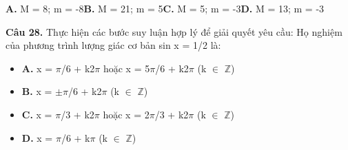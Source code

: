\documentclass[11pt,a4paper]{article}
\begin{document}
\hspace*{1.5em}\textbf{A.} M = 8; m = -8\quad\quad \textbf{B.} M = 21; m = 5\quad\quad \textbf{C.} M = 5; m = -3\quad\quad \textbf{D.} M = 13; m = -3\par\vspace{2pt}
\textbf{\color{primary} Câu 28.} Thực hiện các bước suy luận hợp lý để giải quyết yêu cầu: Họ nghiệm của phương trình lượng giác cơ bản sin x = 1/2 là:\par
\begin{itemize}\setlength{\itemsep}{1pt}\setlength{\parskip}{0pt}
  \item[] \textbf{A.} x = $\pi$/6 + k2$\pi$ hoặc x = 5$\pi$/6 + k2$\pi$ (k $\in$ $\mathbb{Z}$)
  \item[] \textbf{B.} x = $\pm$$\pi$/6 + k2$\pi$ (k $\in$ $\mathbb{Z}$)
  \item[] \textbf{C.} x = $\pi$/3 + k2$\pi$ hoặc x = 2$\pi$/3 + k2$\pi$ (k $\in$ $\mathbb{Z}$)
  \item[] \textbf{D.} x = $\pi$/6 + k$\pi$ (k $\in$ $\mathbb{Z}$)
\end{itemize}\vspace{2pt}
\end{document}
